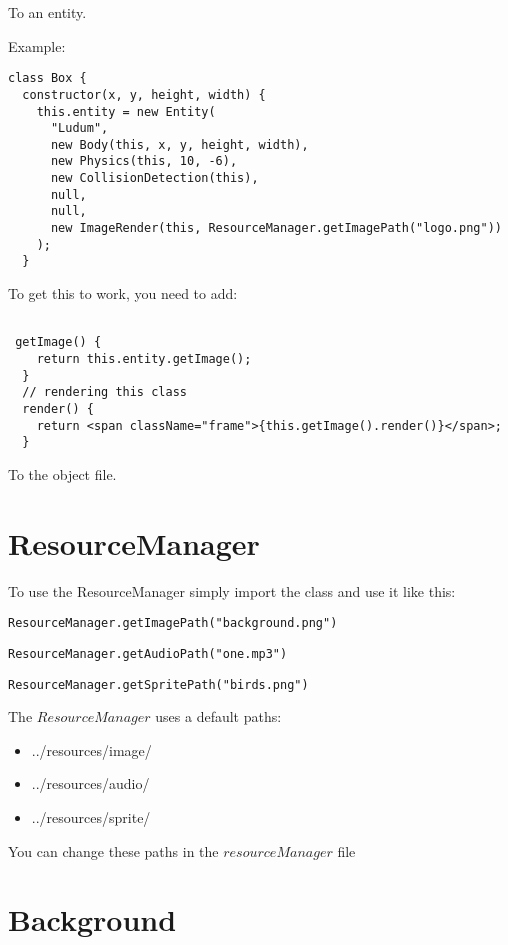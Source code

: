 To an entity.

Example:
\begin{lstlisting}
class Box {
  constructor(x, y, height, width) {
    this.entity = new Entity(
      "Ludum",
      new Body(this, x, y, height, width),
      new Physics(this, 10, -6),
      new CollisionDetection(this),
      null,
      null,
      new ImageRender(this, ResourceManager.getImagePath("logo.png"))
    );
  }
\end{lstlisting}

To get this to work, you need to add:
\begin{lstlisting}

 getImage() {
    return this.entity.getImage();
  }
  // rendering this class
  render() {
    return <span className="frame">{this.getImage().render()}</span>;
  }
\end{lstlisting}

To the object file.
\section{ResourceManager}

To use the ResourceManager simply import the class and use it like this:

\begin{lstlisting}
ResourceManager.getImagePath("background.png")
\end{lstlisting}

\begin{lstlisting}
ResourceManager.getAudioPath("one.mp3")
\end{lstlisting}

\begin{lstlisting}
ResourceManager.getSpritePath("birds.png")
\end{lstlisting}

The $ResourceManager$ uses a default paths:

\begin{itemize}
	\item ../resources/image/
    \item ../resources/audio/
    \item ../resources/sprite/
\end{itemize}

You can change these paths in the $resourceManager$ file

\section{Background}

